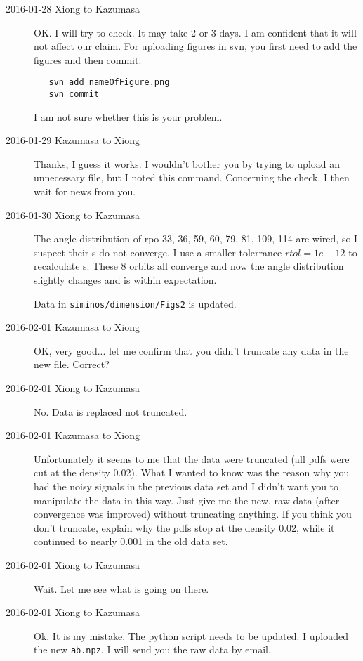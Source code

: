 \begin{description}
\item[2016-01-28 Xiong to Kazumasa]
OK. I will try to check. It may take 2 or 3 days. I am confident that it
will not affect our claim.
For uploading figures in svn, you first need to add the figures and then
commit.
\begin{verbatim}
   svn add nameOfFigure.png
   svn commit
\end{verbatim}
I am not sure whether this is your problem.

\item[2016-01-29 Kazumasa to Xiong]
Thanks, I guess it works. I wouldn't bother you by trying to upload an unnecessary file, but I noted this command.
Concerning the check, I then wait for news from you.

\item[2016-01-30 Xiong to Kazumasa]
The angle distribution of rpo 33, 36, 59, 60, 79, 81, 109, 114
are wired, so I suspect their \Fv s do not converge. I use a smaller
tolerrance $rtol = 1e-12$ to recalculate \Fv s. These 8 orbits
all converge and now the angle distribution slightly changes and is
within expectation.

Data in \texttt{siminos/dimension/Figs2} is updated.

\item[2016-02-01 Kazumasa to Xiong]

OK, very good... let me confirm that you didn't truncate any data in the new file. Correct?

\item[2016-02-01 Xiong to Kazumasa]
No.
Data is replaced not truncated.

\item[2016-02-01 Kazumasa to Xiong]

Unfortunately it seems to me that the data were truncated (all pdfs were cut at the density 0.02). What I wanted to know was the reason why you had the noisy signals in the previous data set and I didn't want you to manipulate the data in this way. Just give me the new, raw data (after convergence was improved) without truncating anything. If you think you don't truncate, explain why the pdfs stop at the density 0.02, while it continued to nearly 0.001 in the old data set.

\item[2016-02-01 Xiong to Kazumasa]
Wait. Let me see what is going on there.

\item[2016-02-01 Xiong to Kazumasa]
Ok. It is my mistake. The python script needs to be updated.
I uploaded the new \texttt{ab.npz}. I will send you the raw
data by email.


\end{description}
